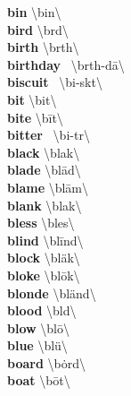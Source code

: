 \documentclass[10pt,a4paper]{article}
\begin{document}
\begin{multicols}{2}
\textbf{ bin }\quad \textbackslash \textprimstress bin\textbackslash \\
\textbf{ bird }\quad \textbackslash \textprimstress b\textschwa rd\textbackslash \\
\textbf{ birth }\quad \textbackslash \textprimstress b\textschwa rth\textbackslash \\
\textbf{ birthday }\quad \ \textbackslash \textprimstress b\textschwa rth-\textsecstress d\={a}\textbackslash \\
\textbf{ biscuit }\quad \ \textbackslash \textprimstress bi-sk\textschwa t\textbackslash \\
\textbf{ bit }\quad \textbackslash \textprimstress bit\textbackslash \\
\textbf{ bite }\quad \textbackslash \textprimstress b\={i}t\textbackslash \\
\textbf{ bitter }\quad \ \textbackslash \textprimstress bi-t\textschwa r\textbackslash \\
\textbf{ black }\quad \textbackslash \textprimstress blak\textbackslash \\
\textbf{ blade }\quad \textbackslash \textprimstress bl\={a}d\textbackslash \\
\textbf{ blame }\quad \textbackslash \textprimstress bl\={a}m\textbackslash \\
\textbf{ blank }\quad \textbackslash \textprimstress bla\engma k\textbackslash \\
\textbf{ bless }\quad \textbackslash \textprimstress bles\textbackslash \\
\textbf{ blind }\quad \textbackslash \textprimstress bl\={i}nd\textbackslash \\
\textbf{ block }\quad \textbackslash \textprimstress bl\"{a}k\textbackslash \\
\textbf{ bloke }\quad \textbackslash \textprimstress bl\={o}k\textbackslash \\
\textbf{ blonde }\quad \textbackslash \textprimstress bl\"{a}nd\textbackslash \\
\textbf{ blood }\quad \textbackslash \textprimstress bl\textschwa d\textbackslash \\
\textbf{ blow }\quad \textbackslash \textprimstress bl\={o}\textbackslash \\
\textbf{ blue }\quad \textbackslash \textprimstress bl\"{u}\textbackslash \\
\textbf{ board }\quad \textbackslash \textprimstress b\.{o}rd\textbackslash \\
\textbf{ boat }\quad \textbackslash \textprimstress b\={o}t\textbackslash \\

\end{multicols}
\end{document}
